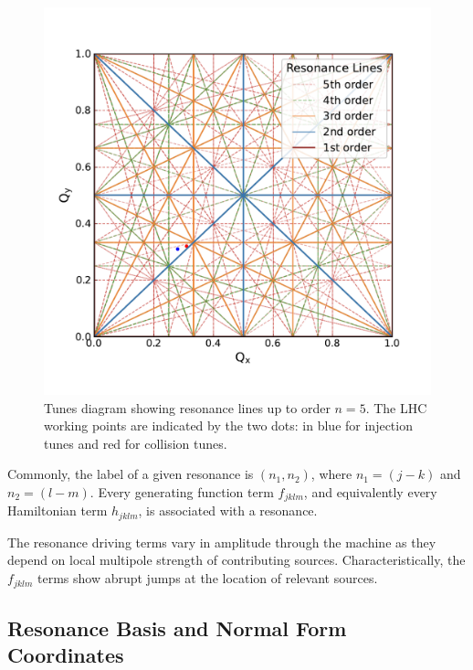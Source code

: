 \begin{figure}[!htb]
    \centering
    \includegraphics[width = 0.9\linewidth]{Figures/Beam_Dynamics_Theory/tune_diagram_fifth_order_with_working_points.pdf}
    \caption{Tunes diagram showing resonance lines up to order \(n = 5\). The LHC working points are indicated by the two dots: in \textcolor{wpblue}{blue} for injection tunes and \textcolor{wpred}{red} for collision tunes.}
    \label{figure:tune_diagram_fifth_order}
\end{figure}

Commonly, the label of a given resonance is \(\left( n_1, n_2 \right)\), where \(n_1 = \left( j - k \right)\) and \(n_2 = \left( l - m \right)\).
Every generating function term \(f_{jklm}\), and equivalently every Hamiltonian term \(h_{jklm}\), is associated with a resonance.

The resonance driving terms vary in amplitude through the machine as they depend on local multipole strength of contributing sources.
Characteristically, the \(f_{jklm}\) terms show abrupt jumps at the location of relevant sources.


\subsection{Resonance Basis and Normal Form Coordinates}

